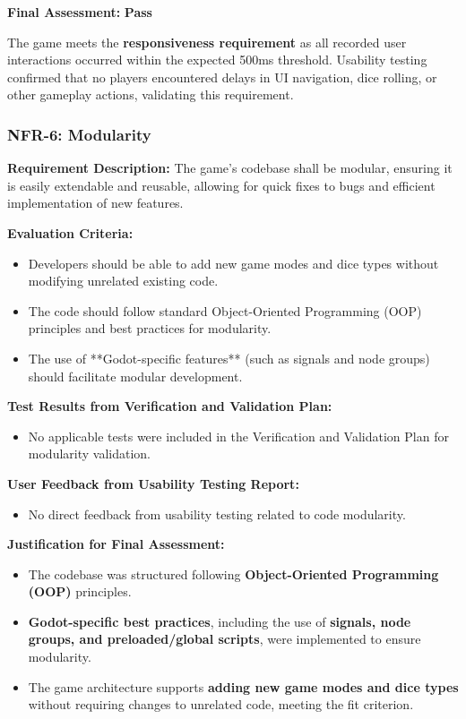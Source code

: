 \documentclass[12pt, titlepage]{article}
\begin{document}
\textbf{Final Assessment:} \textbf{Pass}  

The game meets the \textbf{responsiveness requirement} as all recorded user interactions occurred within the expected 500ms threshold. Usability testing confirmed that no players encountered delays in UI navigation, dice rolling, or other gameplay actions, validating this requirement.


\subsubsection{NFR-6: Modularity}

\textbf{Requirement Description:}  
The game’s codebase shall be modular, ensuring it is easily extendable and reusable, allowing for quick fixes to bugs and efficient implementation of new features.

\textbf{Evaluation Criteria:}  
\begin{itemize}
    \item Developers should be able to add new game modes and dice types without modifying unrelated existing code.
    \item The code should follow standard Object-Oriented Programming (OOP) principles and best practices for modularity.
    \item The use of **Godot-specific features** (such as signals and node groups) should facilitate modular development.
\end{itemize}

\textbf{Test Results from Verification and Validation Plan:}  
\begin{itemize}
    \item No applicable tests were included in the Verification and Validation Plan for modularity validation.
\end{itemize}

\textbf{User Feedback from Usability Testing Report:}  
\begin{itemize}
    \item No direct feedback from usability testing related to code modularity.
\end{itemize}

\textbf{Justification for Final Assessment:}  
\begin{itemize}
    \item The codebase was structured following \textbf{Object-Oriented Programming (OOP)} principles.
    \item \textbf{Godot-specific best practices}, including the use of \textbf{signals, node groups, and preloaded/global scripts}, were implemented to ensure modularity.
    \item The game architecture supports \textbf{adding new game modes and dice types} without requiring changes to unrelated code, meeting the fit criterion.
\end{itemize}
\end{document}
